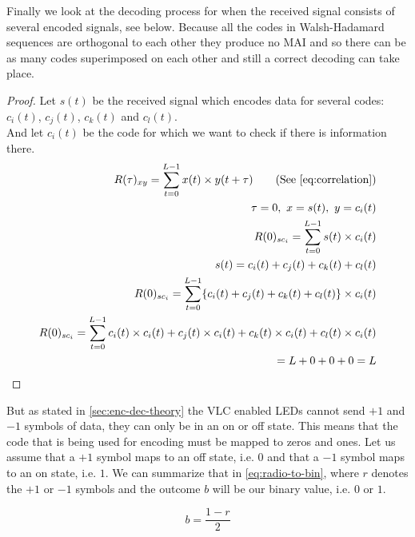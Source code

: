 		Finally we look at the decoding process for when the received signal consists of several encoded signals, see below. 
		Because all the codes in Walsh-Hadamard sequences are orthogonal to each other they produce no MAI and so there can be as many codes superimposed on each other and still a correct decoding can take place. 


		\begin{proof}
			Let $s(t)$ be the received signal which encodes data for several codes: $c_i(t)$, $c_j(t)$, $c_k(t)$ and $c_l(t)$.\\
			And let $c_i(t)$ be the code for which we want to check if there is information there. \\

			\begin{align*}
				R(\tau)_{xy} = \displaystyle\sum_{t = 0} ^ {L - 1} x(t) \times y(t + \tau)	\tag{See \autoref{eq:correlation}}
				\\ \tau = 0,\ x = s(t),\ y = c_i(t)	
				\\ R(0)_{sc_{i}} = \displaystyle\sum_{t = 0} ^ {L - 1} s(t) \times c_i(t)	
				\\ s(t) = c_i(t) + c_j(t) + c_k(t) + c_l(t)															
				\\ R(0)_{sc_{i}} = \displaystyle\sum_{t = 0} ^ {L - 1} \{ c_i(t) + c_j(t) + c_k(t) + c_l(t) \} \times c_i(t)
				\\ R(0)_{sc_{i}} = \displaystyle\sum_{t = 0} ^ {L - 1} c_i(t) \times c_i(t) + c_j(t) \times c_i(t) + c_k(t) \times c_i(t) + c_l(t) \times c_i(t)
				\\ = L + 0 + 0 + 0 = L
			\end{align*}

		\end{proof}

		But as stated in \autoref{sec:enc-dec-theory} the VLC enabled LEDs cannot send $+1$ and $-1$ symbols of data, they can only be in an on or off state.
		This means that the code that is being used for encoding must be mapped to zeros and ones.
		Let us assume that a $+1$ symbol maps to an off state, i.e. $0$ and that a $-1$ symbol maps to an on state, i.e. $1$.
		We can summarize that in \autoref{eq:radio-to-bin}, where $r$ denotes the $+1$ or $-1$ symbols and the outcome $b$ will be our binary value, i.e. $0$ or $1$.

		\begin{equation}
			b = \frac{1 - r}{2}
			\label{eq:radio-to-bin}
		\end{equation}

